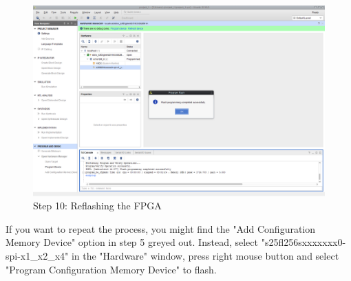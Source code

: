 \begin{figure}
  \includegraphics[width=\linewidth]{images/vivado09.png}
  \caption{Step 10: Reflashing the FPGA}
  \label{fig:vivado10}
\end{figure}

If you want to repeat the process, you might find the "Add Configuration Memory Device" option in step 5 greyed out. Instead, select "s25fl256sxxxxxxx0-spi-x1_x2_x4"  in the "Hardware" window, press right mouse button and select "Program Configuration Memory Device" to flash.
















